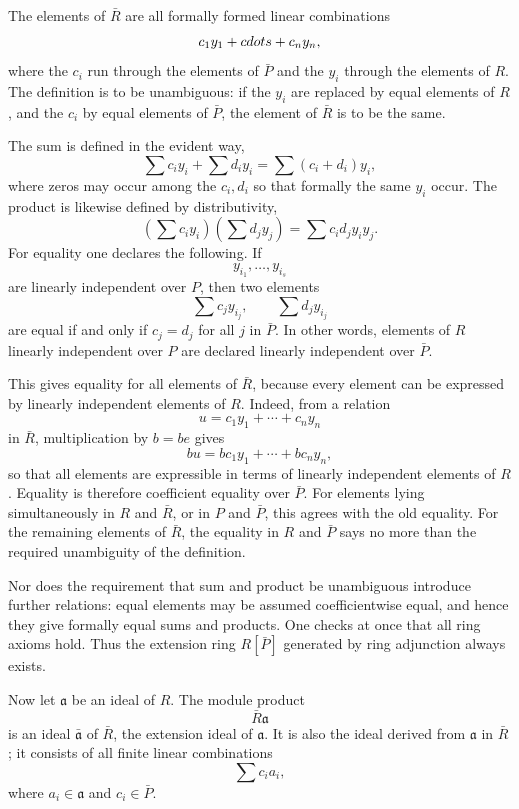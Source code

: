 \documentclass[
  12pt,
]{article}
\begin{document}
The elements of \(\bar R\) are all formally formed linear combinations
\[
  c_1y_1+\\cdots+c_ny_n,
\] where the \(c_i\) run through the elements of \(\bar P\) and the
\(y_i\) through the elements of \(R\). The definition is to be
unambiguous: if the \(y_i\) are replaced by equal elements of \(R\), and
the \(c_i\) by equal elements of \(\bar P\), the element of \(\bar R\)
is to be the same.

The sum is defined in the evident way, \[
  \sum c_i y_i+
  \sum d_i y_i=
  \sum (c_i+d_i)y_i,
\] where zeros may occur among the \(c_i,d_i\) so that formally the same
\(y_i\) occur. The product is likewise defined by distributivity, \[
  \left(\sum c_i y_i\right)
  \left(\sum d_j y_j\right)
  =\sum c_i d_j y_i y_j.
\] For equality one declares the following. If \[
  y_{i_1},\ldots,y_{i_s}
\] are linearly independent over \(P\), then two elements \[
  \sum c_j y_{i_j},\qquad \sum d_j y_{i_j}
\] are equal if and only if \(c_j=d_j\) for all \(j\) in \(\bar P\). In
other words, elements of \(R\) linearly independent over \(P\) are
declared linearly independent over \(\bar P\).

This gives equality for all elements of \(\bar R\), because every
element can be expressed by linearly independent elements of \(R\).
Indeed, from a relation \[
  u=c_1y_1+
\cdots+c_ny_n
\] in \(\bar R\), multiplication by \(b=be\) gives \[
  bu=bc_1y_1+
\cdots+bc_ny_n,
\] so that all elements are expressible in terms of linearly independent
elements of \(R\). Equality is therefore coefficient equality over
\(\bar P\). For elements lying simultaneously in \(R\) and \(\bar R\),
or in \(P\) and \(\bar P\), this agrees with the old equality. For the
remaining elements of \(\bar R\), the equality in \(R\) and \(\bar P\)
says no more than the required unambiguity of the definition.

Nor does the requirement that sum and product be unambiguous introduce
further relations: equal elements may be assumed coefficientwise equal,
and hence they give formally equal sums and products. One checks at once
that all ring axioms hold. Thus the extension ring \(R[\bar P]\)
generated by ring adjunction always exists.

Now let \(\mathfrak a\) be an ideal of \(R\). The module product \[
  \bar R\mathfrak a
\] is an ideal \(\bar{\mathfrak a}\) of \(\bar R\), the extension ideal
of \(\mathfrak a\). It is also the ideal derived from \(\mathfrak a\) in
\(\bar R\); it consists of all finite linear combinations \[
  \sum c_i a_i,
\] where \(a_i\in\mathfrak a\) and \(c_i\in\bar P\).
\end{document}
